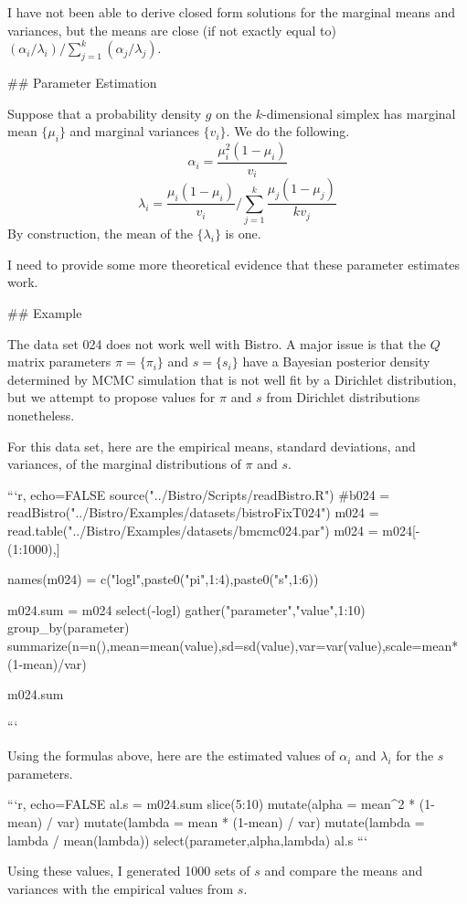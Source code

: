 I have not been able to derive closed form solutions for the marginal means and variances,
but the means are close (if not exactly equal to) $(\alpha_i/\lambda_i) \big/ \sum_{j=1}^k (\alpha_j/\lambda_j)$.

## Parameter Estimation

Suppose that a probability density $g$ on the $k$-dimensional simplex has marginal mean $\{\mu_i\}$ and marginal variances $\{v_i\}$.
We do the following.
$$
\alpha_i = \frac{\mu_i^2(1-\mu_i)}{v_i}
$$
$$
\lambda_i = \frac{\mu_i(1-\mu_i)}{v_i} \Bigg/ \sum_{j=1}^k \frac{\mu_j(1-\mu_j)}{kv_j}
$$
By construction,
the mean of the $\{\lambda_i\}$ is one.

I need to provide some more theoretical evidence that these parameter estimates work.

## Example

The data set 024 does not work well with Bistro.
A major issue is that the $Q$ matrix parameters $\pi = \{\pi_i\}$ and $s = \{s_i\}$
have a Bayesian posterior density determined by MCMC simulation
that is not well fit by a Dirichlet distribution,
but we attempt to propose values for $\pi$ and $s$ from Dirichlet distributions nonetheless.

For this data set, here are the empirical means, standard deviations, and variances, of the marginal distributions of $\pi$ and $s$.

```{r, echo=FALSE}
source("../Bistro/Scripts/readBistro.R")
#b024 = readBistro("../Bistro/Examples/datasets/bistroFixT024")
m024 = read.table("../Bistro/Examples/datasets/bmcmc024.par")
m024 = m024[-(1:1000),]

names(m024) = c("logl",paste0("pi",1:4),paste0("s",1:6))

m024.sum = m024 %
  select(-logl) %
  gather("parameter","value",1:10) %
  group_by(parameter) %
  summarize(n=n(),mean=mean(value),sd=sd(value),var=var(value),scale=mean*(1-mean)/var)

m024.sum

```

Using the formulas above,
here are the estimated values of $\alpha_i$ and $\lambda_i$ for the $s$ parameters.

```{r, echo=FALSE}
al.s = m024.sum %
  slice(5:10) %
  mutate(alpha = mean^2 * (1-mean) / var) %
  mutate(lambda = mean * (1-mean) / var) %
  mutate(lambda = lambda / mean(lambda)) %
  select(parameter,alpha,lambda)
al.s
```

Using these values,
I generated 1000 sets of $s$ and compare the means and variances with the empirical values from $s$.

